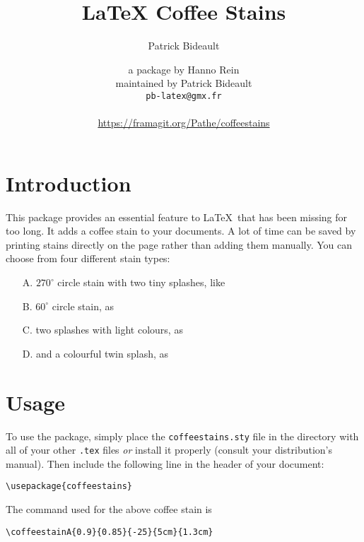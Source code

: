 \documentclass[a4paper, 11pt, BCOR = 0 pt, oneside, english]{scrartcl}
\author{Patrick Bideault}
\begin{document}
\title{LaTeX Coffee Stains}
\author{a package by Hanno Rein\\
  maintained by Patrick Bideault\\
  \texttt{pb-latex@gmx.fr}\\
  ~\\
  \url{https://framagit.org/Pathe/coffeestains}}
\renewcommand{\today}{version \gitRel{} -- \DTMtoday{}}
\maketitle

\label{stainA}
\section{Introduction}
This package provides an essential feature to \LaTeX~that has been missing for
too long. It adds a coffee stain to your documents. A lot of time can be saved
by printing stains directly on the page rather than adding them manually. You can
choose from four different stain types:
\begin{itemize}
\item[A.] $270^\circ$ circle stain with two tiny splashes, like 
  \item[B.] $60^\circ$ circle stain, as 
  \item[C.] two splashes with light colours, as 
  \item[D.] and a colourful twin splash, as 
\end{itemize}

\section{Usage}
To use the package, simply place the \texttt{coffeestains.sty} file in the directory with all of your 
other \texttt{.tex} files \textit{or} install it properly (consult your distribution's manual). 
Then include the following line in the header of your document:
\begin{verbatim}
\usepackage{coffeestains}
\end{verbatim}

\vfill{}

\begin{tcolorbox}
  The command used for the above coffee stain is

  \verb|\coffeestainA{0.9}{0.85}{-25}{5cm}{1.3cm}|
\end{tcolorbox}
\newpage{}
\label{stainB}
\end{document}
